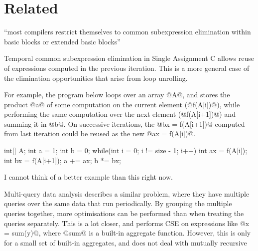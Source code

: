 \section{Related}
\label{s:Related}

``most compilers restrict themselves to common subexpression elimination within basic blocks or extended basic blocks''
\cite{debray1992compiler}

Temporal common subexpression elimination in Single Assignment C
allows reuse of expressions computed in the previous iteration\cite{imlig2001loop}.
This is a more general case of the elimination opportunities that arise from loop unrolling.

For example, the program below loops over an array @A@, and stores the product @a@ of some computation on the current element (@f(A[i])@), while performing the same computation over the next element (@f(A[i+1])@) and summing it in @b@.
On successive iterations, the @bx = f(A[i+1])@ computed from last iteration could be reused as the new @ax = f(A[i])@.
\begin{code}
int[] A;
int a = 1;
int b = 0;
while(int i = 0; i != size - 1; i++)  {
  int ax = f(A[i]);
  int bx = f(A[i+1]);
  a += ax;
  b *= bx;
}
\end{code}

I cannot think of a better example than this right now.

Multi-query data analysis\cite{andrade2003efficient} describes a similar problem, where they have multiple queries over the same data that run periodically.
By grouping the multiple queries together, more optimisations can be performed than when treating the queries separately.
This is a lot closer, and performs CSE on expressions like @x = sum(y)@, where @sum@ is a built-in aggregate function.
However, this is only for a small set of built-in aggregates, and does not deal with mutually recursive
